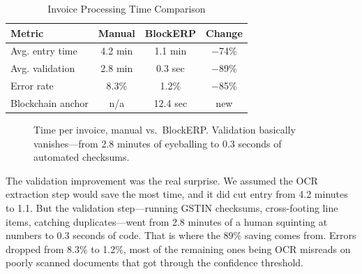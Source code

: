 \documentclass[conference]{IEEEtran}
\begin{document}
\begin{table}[htbp]
\caption{Invoice Processing Time Comparison}
\begin{center}
\renewcommand{\arraystretch}{1.2}
\begin{tabular}{|l|c|c|c|}
\hline
\textbf{Metric} & \textbf{Manual} & \textbf{BlockERP} & \textbf{Change} \\
\hline
Avg. entry time & 4.2 min & 1.1 min & $-$74\% \\
\hline
Avg. validation & 2.8 min & 0.3 sec & $-$89\% \\
\hline
Error rate & 8.3\% & 1.2\% & $-$85\% \\
\hline
Blockchain anchor & n/a & 12.4 sec & new \\
\hline
\end{tabular}
\label{tab_efficiency}
\end{center}
\end{table}

\begin{figure}[htbp]
\begin{center}
\end{center}
\caption{Time per invoice, manual vs.\ BlockERP. Validation basically vanishes---from 2.8 minutes of eyeballing to 0.3 seconds of automated checksums.}
\label{fig_time}
\end{figure}

The validation improvement was the real surprise. We assumed the OCR extraction step would save the most time, and it did cut entry from 4.2 minutes to 1.1. But the validation step---running GSTIN checksums, cross-footing line items, catching duplicates---went from 2.8 minutes of a human squinting at numbers to 0.3 seconds of code. That is where the 89\% saving comes from. Errors dropped from 8.3\% to 1.2\%, most of the remaining ones being OCR misreads on poorly scanned documents that got through the confidence threshold.
\end{document}
